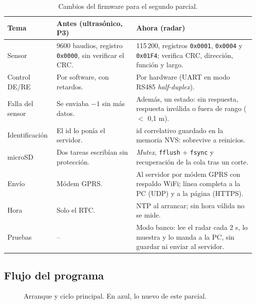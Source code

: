 \documentclass[11pt,a4paper]{article}
\begin{document}
\begin{table}[H]
    \centering
    \small
    \caption{Cambios del firmware para el segundo parcial.}
    \begin{tabularx}{\textwidth}{>{\raggedright\arraybackslash}p{3.2cm}LL}
        \toprule
        \textbf{Tema} & \textbf{Antes (ultrasónico, P3)} & \textbf{Ahora (radar)} \\
        \midrule
        Sensor & 9600 baudios, registro \texttt{0x0000}, sin verificar el CRC. &
            115\,200, registros \texttt{0x0001}, \texttt{0x0004} y
            \texttt{0x01F4}; verifica CRC, dirección, función y largo. \\
        Control DE/RE & Por software, con retardos. & Por hardware (UART en
            modo RS485 \emph{half-duplex}). \\
        Falla del sensor & Se enviaba $-1$ sin más datos. & Además, un
            estado: sin respuesta, respuesta inválida o fuera de
            rango ($<$ 0,1 m). \\
        Identificación & El id lo ponía el servidor. & id
            correlativo guardado en la memoria NVS: sobrevive a reinicios. \\
        microSD & Dos tareas escribían sin protección. & \emph{Mutex},
            \texttt{fflush} + \texttt{fsync} y recuperación de la cola tras un
            corte. \\
        Envío & Módem GPRS. & Al servidor por módem GPRS con respaldo
            WiFi; línea completa a la PC (UDP) y a la página (HTTPS). \\
        Hora & Solo el RTC. & NTP al arrancar; sin hora válida no se mide. \\
        Pruebas & -- & Modo banco: lee el radar cada 2 s, lo
            muestra y lo manda a la PC, sin guardar ni enviar al servidor. \\
        \bottomrule
    \end{tabularx}
\end{table}

\subsection{Flujo del programa}

\begin{figure}[!htbp]
    \centering
    \resizebox{0.98\textwidth}{!}{}
    \caption{Arranque y ciclo principal. En azul, lo nuevo de este parcial.}
\end{figure}
\end{document}
